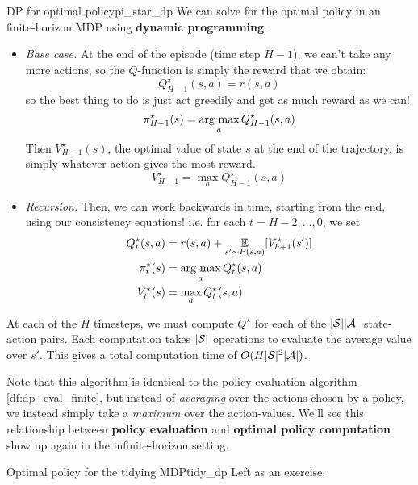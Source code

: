 \documentclass[\main/main]{subfiles}
\begin{document}
\begin{definition}{DP for optimal policy}{pi_star_dp}
    We can solve for the optimal policy in an finite-horizon MDP using \textbf{dynamic programming}.
    
    \begin{itemize}
    \item \emph{Base case.} At the end of the episode (time step $H-1$),
        we can't take any more actions, so the $Q$-function is simply the reward
        that we obtain:
        \[
            Q^\star_{H-1}(s, a) = r(s, a)
        \]
        so the best thing to do is just act greedily
        and get as much reward as we can!
        \[
            \pi^\star_{H-1}(s) = \argmax_a Q^\star_{H-1}(s, a)
        \]
        Then $V^\star_{H-1}(s)$, the optimal value of state $s$ at the end of the
        trajectory, is simply whatever action gives the most reward.
        \[
            V^\star_{H-1} = \max_a Q^\star_{H-1}(s, a)
        \]
    
    \item \emph{Recursion.} Then, we can work backwards in time, starting from the
        end, using our consistency equations! i.e. for each $t = H-2, \dots, 0$, we set
        \begin{align*}
            Q^\star_{t}(s, a) &= r(s, a) + \E_{s' \sim P(s, a)} [V^\star_{h+1}(s')] \\
            \pi^\star_{t}(s) &= \argmax_a Q^\star_{t}(s, a) \\
            V^\star_{t}(s) &= \max_a Q^\star_{t}(s, a)
        \end{align*}
    \end{itemize}
\end{definition}

At each of the $H$ timesteps, we must compute $Q^{\star}$ for each of the $|\S| |\A|$ state-action pairs. Each computation takes $|\S|$ operations to evaluate the average value over $s'$. This gives a total computation time of $O(H |\S|^2 |\A|)$.

Note that this algorithm is identical to the policy evaluation algorithm \ref{df:dp_eval_finite}, but instead of \emph{averaging} over the actions chosen by a policy, we instead simply take a \emph{maximum} over the action-values. We'll see this relationship between \textbf{policy evaluation} and \textbf{optimal policy computation} show up again in the infinite-horizon setting.

\begin{example}{Optimal policy for the tidying MDP}{tidy_dp}
    Left as an exercise.
\end{example}
\end{document}
